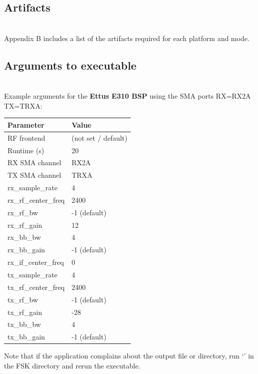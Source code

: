 \subsection{Artifacts}
\assetsdoc \\
\noindent Appendix B includes a list of the artifacts required for each platform and mode.
\subsection{Arguments to executable}
\assetsdoc \\
\noindent Example arguments for the \textbf{Ettus E310 BSP} using the SMA ports RX=RX2A TX=TRXA:\\
\begin{tabular}{|l|l|}
\hline
\rowcolor{blue}
Parameter 	&        Value  	\\
\hline
RF frontend 	&        (not set / default)  	\\
\hline
Runtime (s) 	&        20 	        \\
\hline
RX SMA channel 	&        RX2A              	\\
\hline
TX SMA channel 	&        TRXA           	\\
\hline
rx\_sample\_rate 	&4 	                \\
\hline
rx\_rf\_center\_freq 	&2400  	\\
\hline
rx\_rf\_bw 	&        -1 (default)   \\
\hline
rx\_rf\_gain 	&        12       	\\
\hline
rx\_bb\_bw 	&        4 	        \\
\hline
rx\_bb\_gain 	&        -1 (default) 	\\
\hline
rx\_if\_center\_freq 	&0              	\\
\hline
tx\_sample\_rate 	&4              	\\
\hline
tx\_rf\_center\_freq 	&2400 	        \\
\hline
tx\_rf\_bw 	&        -1 (default)   \\
\hline
tx\_rf\_gain 	&        -28 	        \\
\hline
tx\_bb\_bw 	&        4        	\\
\hline
tx\_bb\_gain    &       -1 (default) \\
\hline
\end{tabular}\par\medskip

\noindent Note that if the application complains about the output file or directory, run `' in the FSK directory and rerun the executable.
\pagebreak
